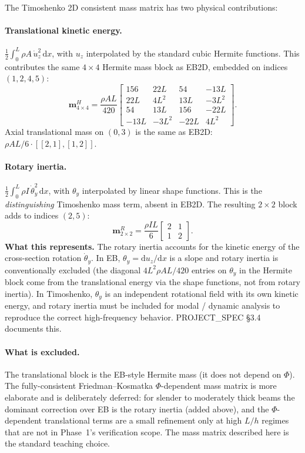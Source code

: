 \documentclass[11pt,a4paper]{article}
\newcommand{\dd}{\mathrm{d}}
\newcommand{\bmath}[1]{\boldsymbol{#1}}
\begin{document}
The Timoshenko 2D consistent mass matrix has two physical contributions:

\paragraph{Translational kinetic energy.}
$\tfrac{1}{2} \int_0^L \rho A\,\dot u_z^2\,\dd x$, with $u_z$ interpolated by the standard cubic Hermite functions. This contributes the same $4\times 4$ Hermite mass block as EB2D, embedded on indices $(1, 2, 4, 5)$:
\[
\bmath{m}^{H}_{4\times 4} = \dfrac{\rho A L}{420}
\begin{bmatrix}
156 & 22L & 54 & -13L \\
22L & 4L^2 & 13L & -3L^2 \\
54 & 13L & 156 & -22L \\
-13L & -3L^2 & -22L & 4L^2
\end{bmatrix}.
\]
Axial translational mass on $(0, 3)$ is the same as EB2D: $\rho AL/6 \cdot [[2,1],[1,2]]$.

\paragraph{Rotary inertia.}
$\tfrac{1}{2} \int_0^L \rho I\,\dot\theta_y^2\,\dd x$, with $\theta_y$ interpolated by linear shape functions. This is the \emph{distinguishing} Timoshenko mass term, absent in EB2D. The resulting $2\times 2$ block adds to indices $(2, 5)$:
\[
\bmath{m}^{R}_{2\times 2} = \dfrac{\rho I L}{6}\begin{bmatrix} 2 & 1 \\ 1 & 2 \end{bmatrix}.
\]
\textbf{What this represents.} The rotary inertia accounts for the kinetic energy of the cross-section rotation $\dot\theta_y$. In EB, $\theta_y = \dd u_z/\dd x$ is a slope and rotary inertia is conventionally excluded (the diagonal $4L^2 \rho A L/420$ entries on $\theta_y$ in the Hermite block come from the translational energy via the shape functions, not from rotary inertia). In Timoshenko, $\theta_y$ is an independent rotational field with its own kinetic energy, and rotary inertia must be included for modal / dynamic analysis to reproduce the correct high-frequency behavior. PROJECT\_SPEC \S3.4 documents this.

\paragraph{What is excluded.}
The translational block is the EB-style Hermite mass (it does not depend on $\Phi$). The fully-consistent Friedman--Kosmatka $\Phi$-dependent mass matrix is more elaborate and is deliberately deferred: for slender to moderately thick beams the dominant correction over EB is the rotary inertia (added above), and the $\Phi$-dependent translational terms are a small refinement only at high $L/h$ regimes that are not in Phase~1's verification scope. The mass matrix described here is the standard teaching choice.
\end{document}
